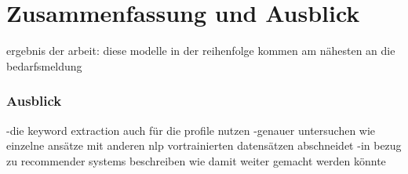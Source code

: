 \chapter{Zusammenfassung und Ausblick}
\label{chap:ergebnisseausblick}

ergebnis der arbeit: diese modelle in der reihenfolge kommen am nähesten an die bedarfsmeldung

\subsection*{Ausblick}
-die keyword extraction auch für die profile nutzen 
-genauer untersuchen wie einzelne ansätze mit anderen nlp vortrainierten datensätzen abschneidet
-in bezug zu recommender systems beschreiben wie damit weiter gemacht werden könnte
\newpage
